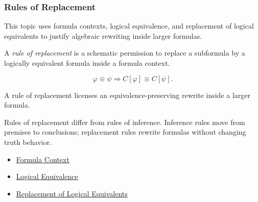 \subsubsection*{Rules of Replacement}

\begin{remark*}
This topic uses formula contexts, logical equivalence, and replacement of
logical equivalents to justify algebraic rewriting inside larger formulas.
\end{remark*}

\begin{tcolorbox}[colback=propbox, colframe=propborder, arc=2pt,
  left=6pt, right=6pt, top=4pt, bottom=4pt,
  title={\small\textbf{Definition (Rule of Replacement)}},
  fonttitle=\small\bfseries]
\begin{definition}
\label{def:rule-of-replacement-propositional-logic}
A \emph{rule of replacement} is a schematic permission to replace a subformula
by a logically equivalent formula inside a formula context.
\end{definition}
\end{tcolorbox}

\begin{remark*}
\[
\varphi\equiv\psi
\Longrightarrow
C[\varphi]\equiv C[\psi].
\]
\end{remark*}

\begin{remark*}
A rule of replacement licenses an equivalence-preserving rewrite inside a larger
formula.
\end{remark*}

\begin{remark*}[Interpretation]
Rules of replacement differ from rules of inference. Inference rules move from
premises to conclusions; replacement rules rewrite formulas without changing
truth behavior.
\end{remark*}

\begin{dependencies}
\begin{itemize}
  \item \hyperref[def:formula-context-propositional-logic]{Formula Context}
  \item \hyperref[def:logical-equivalence-propositional-logic]{Logical Equivalence}
  \item \hyperref[thm:replacement-of-logical-equivalents-propositional-logic]{Replacement of Logical Equivalents}
\end{itemize}
\end{dependencies}

